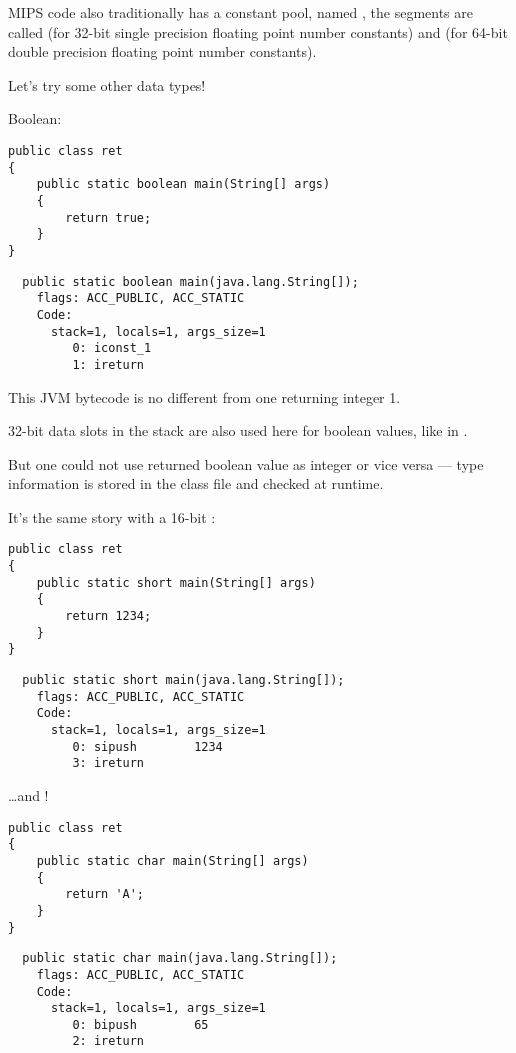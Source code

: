 MIPS code also traditionally has a constant pool, named , the segments
are called  (for 32-bit single precision floating point number constants) and 
(for 64-bit double precision floating point number constants).

Let's try some other data types!

Boolean:

\begin{lstlisting}
public class ret
{
	public static boolean main(String[] args) 
	{
		return true;
	}
}
\end{lstlisting}

\begin{lstlisting}
  public static boolean main(java.lang.String[]);
    flags: ACC_PUBLIC, ACC_STATIC
    Code:
      stack=1, locals=1, args_size=1
         0: iconst_1      
         1: ireturn       
\end{lstlisting}

This JVM bytecode is no different from one returning integer 1.

32-bit data slots in the stack are also used here for boolean values, like in \CCpp.

But one could not use returned boolean value as integer or vice versa --- type information is stored in the class file and checked at runtime.

It's the same story with a 16-bit :

\begin{lstlisting}
public class ret
{
	public static short main(String[] args) 
	{
		return 1234;
	}
}
\end{lstlisting}

\begin{lstlisting}
  public static short main(java.lang.String[]);
    flags: ACC_PUBLIC, ACC_STATIC
    Code:
      stack=1, locals=1, args_size=1
         0: sipush        1234
         3: ireturn       
\end{lstlisting}

\dots and !

\begin{lstlisting}
public class ret
{
	public static char main(String[] args) 
	{
		return 'A';
	}
}
\end{lstlisting}

\begin{lstlisting}
  public static char main(java.lang.String[]);
    flags: ACC_PUBLIC, ACC_STATIC
    Code:
      stack=1, locals=1, args_size=1
         0: bipush        65
         2: ireturn       
\end{lstlisting}

